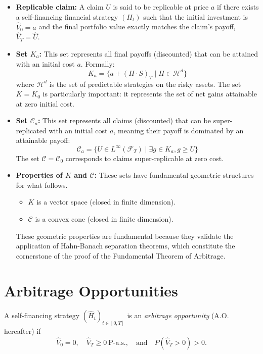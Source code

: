 \begin{itemize}
    \item \textbf{Replicable claim:} A claim $\hat{U}$ is said to be replicable at price $a$ if there exists a self-financing financial strategy $(H_t)$ such that the initial investment is $\hat{V}_0 = a$ and the final portfolio value exactly matches the claim's payoff, $\hat{V}_T = \hat{U}$.
    \item \textbf{Set $K_a$:} This set represents all final payoffs (discounted) that can be attained with an initial cost $a$. Formally:
    \[
    K_a = \{ a + (H \cdot S)_T \mid H \in \mathcal{H}^d \}
    \]
    where $\mathcal{H}^d$ is the set of predictable strategies on the risky assets. The set $K = K_0$ is particularly important: it represents the set of net gains attainable at zero initial cost.
    \item \textbf{Set $\mathcal{C}_a$:} This set represents all claims (discounted) that can be super-replicated with an initial cost $a$, meaning their payoff is dominated by an attainable payoff:
    \[
    \mathcal{C}_a = \{ U \in L^\infty(\mathcal{F}_T) \mid \exists g \in K_a, g \ge U \}
    \]
    The set $\mathcal{C} = \mathcal{C}_0$ corresponds to claims super-replicable at zero cost.
    \item \textbf{Properties of $K$ and $\mathcal{C}$:} These sets have fundamental geometric structures for what follows.
    \begin{itemize}
        \item $K$ is a vector space (closed in finite dimension).
        \item $\mathcal{C}$ is a convex cone (closed in finite dimension).
    \end{itemize}
    These geometric properties are fundamental because they validate the application of Hahn-Banach separation theorems, which constitute the cornerstone of the proof of the Fundamental Theorem of Arbitrage.
\end{itemize}

\section{Arbitrage Opportunities}

\begin{definition}
A self-financing strategy $(\hat H_t)_{t\in[0,T]}$ is an \emph{arbitrage opportunity} (A.O. hereafter) if
\begin{equation}
\hat V_0 = 0, \quad \hat V_T \ge 0 \ \text{P-a.s.}, \quad \text{and} \quad P(\hat V_T > 0) > 0.
\end{equation}
\end{definition}

